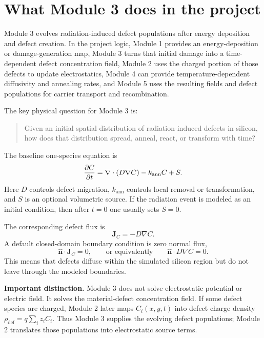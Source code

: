 \documentclass[11pt]{article}
\newcommand{\Cfield}{C}
\newcommand{\Jdef}{\mathbf{J}_C}
\newcommand{\Ddef}{D}
\newcommand{\kann}{k_{\mathrm{ann}}}
\newcommand{\Sdef}{S}
\begin{document}
\section{What Module 3 does in the project}

Module 3 evolves radiation-induced defect populations after energy deposition and defect creation. In the project logic, Module 1 provides an energy-deposition or damage-generation map, Module 3 turns that initial damage into a time-dependent defect concentration field, Module 2 uses the charged portion of those defects to update electrostatics, Module 4 can provide temperature-dependent diffusivity and annealing rates, and Module 5 uses the resulting fields and defect populations for carrier transport and recombination.

The key physical question for Module 3 is:
\begin{quote}
Given an initial spatial distribution of radiation-induced defects in silicon, how does that distribution spread, anneal, react, or transform with time?
\end{quote}

The baseline one-species equation is
\begin{equation}
\pdv{\Cfield}{t}=\nabla\cdot\left(\Ddef\nabla \Cfield\right)-\kann \Cfield+\Sdef.
\label{eq:strong_module3}
\end{equation}
Here $\Ddef$ controls defect migration, $\kann$ controls local removal or transformation, and $\Sdef$ is an optional volumetric source. If the radiation event is modeled as an initial condition, then after $t=0$ one usually sets $\Sdef=0$.

The corresponding defect flux is
\begin{equation}
\Jdef=-\Ddef\nabla \Cfield.
\label{eq:flux_module3}
\end{equation}
A default closed-domain boundary condition is zero normal flux,
\begin{equation}
\hat{\mathbf n}\cdot\Jdef=0,
\qquad \text{or equivalently} \qquad
\hat{\mathbf n}\cdot \Ddef\nabla \Cfield=0.
\label{eq:zero_flux}
\end{equation}
This means that defects diffuse within the simulated silicon region but do not leave through the modeled boundaries.

\begin{physicsbox}
\textbf{Important distinction.} Module 3 does not solve electrostatic potential or electric field. It solves the material-defect concentration field. If some defect species are charged, Module 2 later maps $C_i(x,y,t)$ into defect charge density $\rho_{\mathrm{def}}=q\sum_i z_i C_i$. Thus Module 3 supplies the evolving defect populations; Module 2 translates those populations into electrostatic source terms.
\end{physicsbox}
\end{document}

